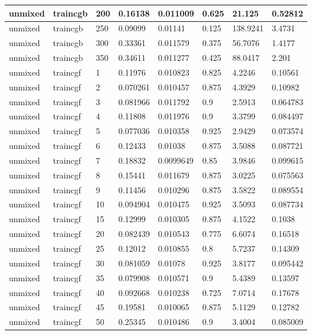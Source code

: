 \begin{longtable}{llllllll}
unmixed & traincgb & 200 & 0.16138 & 0.011009 & 0.625 & 21.125 & 0.52812 \\ \hline 
unmixed & traincgb & 250 & 0.09099 & 0.01141 & 0.125 & 138.9241 & 3.4731 \\ \hline 
unmixed & traincgb & 300 & 0.33361 & 0.011579 & 0.375 & 56.7076 & 1.4177 \\ \hline 
unmixed & traincgb & 350 & 0.34611 & 0.011277 & 0.425 & 88.0417 & 2.201 \\ \hline 
unmixed & traincgf & 1 & 0.11976 & 0.010823 & 0.825 & 4.2246 & 0.10561 \\ \hline 
unmixed & traincgf & 2 & 0.070261 & 0.010457 & 0.875 & 4.3929 & 0.10982 \\ \hline 
unmixed & traincgf & 3 & 0.081966 & 0.011792 & 0.9 & 2.5913 & 0.064783 \\ \hline 
unmixed & traincgf & 4 & 0.11808 & 0.011976 & 0.9 & 3.3799 & 0.084497 \\ \hline 
unmixed & traincgf & 5 & 0.077036 & 0.010358 & 0.925 & 2.9429 & 0.073574 \\ \hline 
unmixed & traincgf & 6 & 0.12433 & 0.01038 & 0.875 & 3.5088 & 0.087721 \\ \hline 
unmixed & traincgf & 7 & 0.18832 & 0.0099649 & 0.85 & 3.9846 & 0.099615 \\ \hline 
unmixed & traincgf & 8 & 0.15441 & 0.011679 & 0.875 & 3.0225 & 0.075563 \\ \hline 
unmixed & traincgf & 9 & 0.11456 & 0.010296 & 0.875 & 3.5822 & 0.089554 \\ \hline 
unmixed & traincgf & 10 & 0.094904 & 0.010475 & 0.925 & 3.5093 & 0.087734 \\ \hline 
unmixed & traincgf & 15 & 0.12999 & 0.010305 & 0.875 & 4.1522 & 0.1038 \\ \hline 
unmixed & traincgf & 20 & 0.082439 & 0.010543 & 0.775 & 6.6074 & 0.16518 \\ \hline 
unmixed & traincgf & 25 & 0.12012 & 0.010855 & 0.8 & 5.7237 & 0.14309 \\ \hline 
unmixed & traincgf & 30 & 0.081059 & 0.01078 & 0.925 & 3.8177 & 0.095442 \\ \hline 
unmixed & traincgf & 35 & 0.079908 & 0.010571 & 0.9 & 5.4389 & 0.13597 \\ \hline 
unmixed & traincgf & 40 & 0.092668 & 0.010238 & 0.725 & 7.0714 & 0.17678 \\ \hline 
unmixed & traincgf & 45 & 0.19581 & 0.010065 & 0.875 & 5.1129 & 0.12782 \\ \hline 
unmixed & traincgf & 50 & 0.25345 & 0.010486 & 0.9 & 3.4004 & 0.085009 \\ \hline 

\end{longtable}
